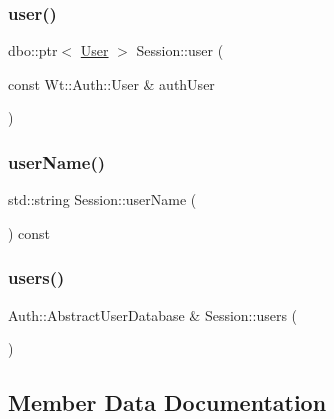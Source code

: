 \mbox{\label{class_session_af4b107688e55ec0614d8181688c7dee7}} 
\subsubsection{\texorpdfstring{user()}{user()}\hspace{0.1cm}{\footnotesize\ttfamily [2/2]}}
{\footnotesize\ttfamily dbo\+::ptr$<$ \hyperlink{class_user}{User} $>$ Session\+::user (\begin{DoxyParamCaption}\item[{const Wt\+::\+Auth\+::\+User \&}]{auth\+User }\end{DoxyParamCaption})}

\mbox{\label{class_session_a7d11b256732932890d327a477585a85f}} 
\subsubsection{\texorpdfstring{user\+Name()}{userName()}}
{\footnotesize\ttfamily std\+::string Session\+::user\+Name (\begin{DoxyParamCaption}{ }\end{DoxyParamCaption}) const}

\mbox{\label{class_session_af91c8b22a14acf05e46265698deb8af4}} 
\subsubsection{\texorpdfstring{users()}{users()}}
{\footnotesize\ttfamily Auth\+::\+Abstract\+User\+Database \& Session\+::users (\begin{DoxyParamCaption}{ }\end{DoxyParamCaption})}



\subsection{Member Data Documentation}
\mbox{\label{class_session_a71e5966d537785ddec69daeb7f203dd5}} 
